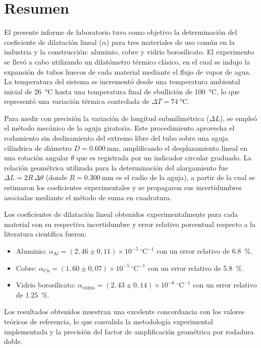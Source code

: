
\section{Resumen}

El presente informe de laboratorio tuvo como objetivo la determinación del coeficiente de dilatación lineal ($\alpha$) para tres materiales de uso común en la industria y la construcción: aluminio, cobre y vidrio borosilicato. El experimento se llevó a cabo utilizando un dilatómetro térmico clásico, en el cual se indujo la expansión de tubos huecos de cada material mediante el flujo de vapor de agua. La temperatura del sistema se incrementó desde una temperatura ambiental inicial de \qty{26}{\celsius} hasta una temperatura final de ebullición de \qty{100}{\celsius}, lo que representó una variación térmica controlada de $\Delta T = \qty{74}{\celsius}$.

Para medir con precisión la variación de longitud submilimétrica ($\Delta L$), se empleó el método mecánico de la aguja giratoria. Este procedimiento aprovecha el rodamiento sin deslizamiento del extremo libre del tubo sobre una aguja cilíndrica de diámetro $D = \qty{0,600}{\milli\meter}$, amplificando el desplazamiento lineal en una rotación angular $\theta$ que es registrada por un indicador circular graduado. La relación geométrica utilizada para la determinación del alargamiento fue $\Delta L = 2R\,\Delta\theta$ (donde $R = \qty{0,300}{\milli\meter}$ es el radio de la aguja), a partir de la cual se estimaron los coeficientes experimentales y se propagaron sus incertidumbres asociadas mediante el método de suma en cuadratura.

Los coeficientes de dilatación lineal obtenidos experimentalmente para cada material con su respectiva incertidumbre y error relativo porcentual respecto a la literatura científica fueron:
\begin{itemize}
    \item Aluminio: $\alpha_{\text{Al}} = (2{,}46 \pm 0{,}11) \times 10^{-5}\ ^\circ\text{C}^{-1}$ con un error relativo de \qty{6,8}{\percent}.
    \item Cobre: $\alpha_{\text{Cu}} = (1{,}60 \pm 0{,}07) \times 10^{-5}\ ^\circ\text{C}^{-1}$ con un error relativo de \qty{5,8}{\percent}.
    \item Vidrio borosilicato: $\alpha_{\text{vidrio}} = (2{,}43 \pm 0{,}14) \times 10^{-6}\ ^\circ\text{C}^{-1}$ con un error relativo de \qty{1,25}{\percent}.
\end{itemize}
Los resultados obtenidos muestran una excelente concordancia con los valores teóricos de referencia, lo que convalida la metodología experimental implementada y la precisión del factor de amplificación geométrica por rodadura doble.